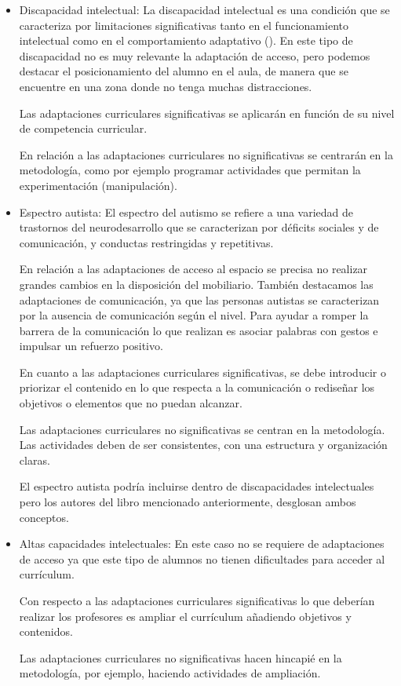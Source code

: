 \begin{itemize}
    \item Discapacidad intelectual: La discapacidad intelectual es una condición que se caracteriza por limitaciones significativas tanto en el funcionamiento intelectual como en el comportamiento adaptativo (\citeauthor{disIntelectual}).
          En este tipo de discapacidad no es muy relevante la adaptación de acceso, pero podemos destacar el posicionamiento del alumno en el aula, de manera que se encuentre en una zona donde no tenga muchas distracciones.

          Las adaptaciones curriculares significativas se aplicarán en función de su nivel de competencia curricular.

          En relación a las adaptaciones curriculares no significativas se centrarán en la metodología, como por ejemplo programar actividades que permitan la experimentación (manipulación).

    \item Espectro autista: El espectro del autismo se refiere a una variedad de trastornos del neurodesarrollo que se caracterizan por déficits sociales y de comunicación, y conductas restringidas y repetitivas.

          En relación a las adaptaciones de acceso al espacio se precisa no realizar grandes cambios en la disposición del mobiliario. También destacamos las adaptaciones de comunicación, ya que las personas autistas se caracterizan por la ausencia de comunicación según el nivel. Para ayudar a romper la barrera de la comunicación lo que realizan es asociar palabras con gestos e impulsar un refuerzo positivo.

          En cuanto a las adaptaciones curriculares significativas, se debe introducir o priorizar el contenido en lo que respecta a la  comunicación o rediseñar los objetivos o elementos que no puedan alcanzar.

          Las adaptaciones curriculares no significativas se centran en la metodología. Las actividades deben de ser consistentes, con una estructura y organización claras.

          El espectro autista podría incluirse dentro de discapacidades intelectuales pero los autores del libro mencionado anteriormente, desglosan ambos conceptos.

    \item Altas capacidades intelectuales: En este caso no se requiere de adaptaciones de acceso ya que  este tipo de alumnos no tienen dificultades para acceder al currículum.

          Con respecto a las adaptaciones curriculares significativas lo que deberían realizar los profesores es ampliar el currículum añadiendo objetivos y contenidos.

          Las adaptaciones curriculares no significativas hacen hincapié en la metodología, por ejemplo, haciendo actividades de ampliación.

\end{itemize}
\nocite{adaptacionUNED}

